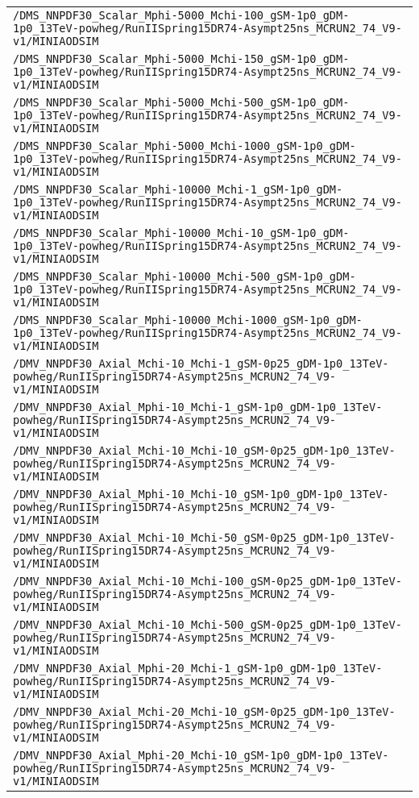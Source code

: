 \begin{center}
\begin{tabular}{l}
\verb!/DMS_NNPDF30_Scalar_Mphi-5000_Mchi-100_gSM-1p0_gDM-1p0_13TeV-powheg/RunIISpring15DR74-Asympt25ns_MCRUN2_74_V9-v1/MINIAODSIM! \tabularnewline
\verb!/DMS_NNPDF30_Scalar_Mphi-5000_Mchi-150_gSM-1p0_gDM-1p0_13TeV-powheg/RunIISpring15DR74-Asympt25ns_MCRUN2_74_V9-v1/MINIAODSIM! \tabularnewline
\verb!/DMS_NNPDF30_Scalar_Mphi-5000_Mchi-500_gSM-1p0_gDM-1p0_13TeV-powheg/RunIISpring15DR74-Asympt25ns_MCRUN2_74_V9-v1/MINIAODSIM! \tabularnewline
\verb!/DMS_NNPDF30_Scalar_Mphi-5000_Mchi-1000_gSM-1p0_gDM-1p0_13TeV-powheg/RunIISpring15DR74-Asympt25ns_MCRUN2_74_V9-v1/MINIAODSIM! \tabularnewline
\verb!/DMS_NNPDF30_Scalar_Mphi-10000_Mchi-1_gSM-1p0_gDM-1p0_13TeV-powheg/RunIISpring15DR74-Asympt25ns_MCRUN2_74_V9-v1/MINIAODSIM! \tabularnewline
\verb!/DMS_NNPDF30_Scalar_Mphi-10000_Mchi-10_gSM-1p0_gDM-1p0_13TeV-powheg/RunIISpring15DR74-Asympt25ns_MCRUN2_74_V9-v1/MINIAODSIM! \tabularnewline
\verb!/DMS_NNPDF30_Scalar_Mphi-10000_Mchi-500_gSM-1p0_gDM-1p0_13TeV-powheg/RunIISpring15DR74-Asympt25ns_MCRUN2_74_V9-v1/MINIAODSIM! \tabularnewline
\verb!/DMS_NNPDF30_Scalar_Mphi-10000_Mchi-1000_gSM-1p0_gDM-1p0_13TeV-powheg/RunIISpring15DR74-Asympt25ns_MCRUN2_74_V9-v1/MINIAODSIM! \tabularnewline
\verb!/DMV_NNPDF30_Axial_Mchi-10_Mchi-1_gSM-0p25_gDM-1p0_13TeV-powheg/RunIISpring15DR74-Asympt25ns_MCRUN2_74_V9-v1/MINIAODSIM! \tabularnewline
\verb!/DMV_NNPDF30_Axial_Mphi-10_Mchi-1_gSM-1p0_gDM-1p0_13TeV-powheg/RunIISpring15DR74-Asympt25ns_MCRUN2_74_V9-v1/MINIAODSIM! \tabularnewline
\verb!/DMV_NNPDF30_Axial_Mchi-10_Mchi-10_gSM-0p25_gDM-1p0_13TeV-powheg/RunIISpring15DR74-Asympt25ns_MCRUN2_74_V9-v1/MINIAODSIM! \tabularnewline
\verb!/DMV_NNPDF30_Axial_Mphi-10_Mchi-10_gSM-1p0_gDM-1p0_13TeV-powheg/RunIISpring15DR74-Asympt25ns_MCRUN2_74_V9-v1/MINIAODSIM! \tabularnewline
\verb!/DMV_NNPDF30_Axial_Mchi-10_Mchi-50_gSM-0p25_gDM-1p0_13TeV-powheg/RunIISpring15DR74-Asympt25ns_MCRUN2_74_V9-v1/MINIAODSIM! \tabularnewline
\verb!/DMV_NNPDF30_Axial_Mchi-10_Mchi-100_gSM-0p25_gDM-1p0_13TeV-powheg/RunIISpring15DR74-Asympt25ns_MCRUN2_74_V9-v1/MINIAODSIM! \tabularnewline
\verb!/DMV_NNPDF30_Axial_Mchi-10_Mchi-500_gSM-0p25_gDM-1p0_13TeV-powheg/RunIISpring15DR74-Asympt25ns_MCRUN2_74_V9-v1/MINIAODSIM! \tabularnewline
\verb!/DMV_NNPDF30_Axial_Mphi-20_Mchi-1_gSM-1p0_gDM-1p0_13TeV-powheg/RunIISpring15DR74-Asympt25ns_MCRUN2_74_V9-v1/MINIAODSIM! \tabularnewline
\verb!/DMV_NNPDF30_Axial_Mchi-20_Mchi-10_gSM-0p25_gDM-1p0_13TeV-powheg/RunIISpring15DR74-Asympt25ns_MCRUN2_74_V9-v1/MINIAODSIM! \tabularnewline
\verb!/DMV_NNPDF30_Axial_Mphi-20_Mchi-10_gSM-1p0_gDM-1p0_13TeV-powheg/RunIISpring15DR74-Asympt25ns_MCRUN2_74_V9-v1/MINIAODSIM! \tabularnewline

\end{tabular}
\end{center}
